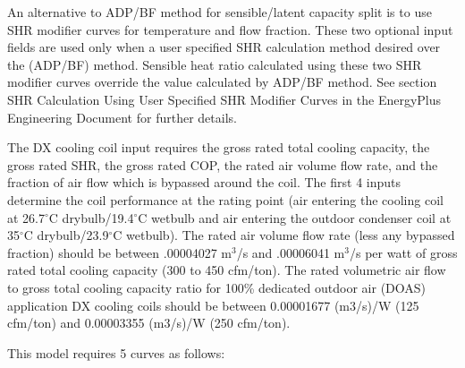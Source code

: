 An alternative to ADP/BF method for sensible/latent capacity split is to use SHR modifier curves for temperature and flow fraction. These two optional input fields are used only when a user specified SHR calculation method desired over the (ADP/BF) method. Sensible heat ratio calculated using these two SHR modifier curves override the value calculated by ADP/BF method. See section SHR Calculation Using User Specified SHR Modifier Curves in the EnergyPlus Engineering Document for further details.

The DX cooling coil input requires the gross rated total cooling capacity, the gross rated SHR, the gross rated COP, the rated air volume flow rate, and the fraction of air flow which is bypassed around the coil. The first 4 inputs determine the coil performance at the rating point (air entering the cooling coil at 26.7$^\circ$C drybulb/19.4$^\circ$C wetbulb and air entering the outdoor condenser coil at 35$^\circ$C drybulb/23.9$^\circ$C wetbulb). The rated air volume flow rate (less any bypassed fraction) should be between .00004027 m\(^{3}\)/s and .00006041 m\(^{3}\)/s per watt of gross rated total cooling capacity (300 to 450 cfm/ton). The rated volumetric air flow to gross total cooling capacity ratio for 100\% dedicated outdoor air (DOAS) application DX cooling coils should be between 0.00001677 (m3/s)/W (125 cfm/ton) and 0.00003355 (m3/s)/W (250 cfm/ton).

This model requires 5 curves as follows:

